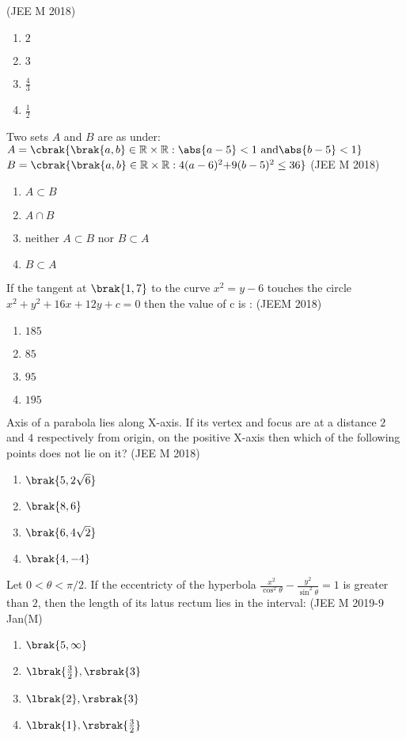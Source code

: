      \hfill{(JEE M 2018)}
	  \begin{enumerate}
    		\item $2$
    		\item $3$
    		\item $\frac{4}{3}$
    		\item $\frac{1}{2}$
	  \end{enumerate}
\item  Two sets $A$ and $B$ are as under:
$A=\cbrak{\brak{a,b}\in\mathbb{R}\times\mathbb{R}:\abs{a-5}<1\text{ and} \abs{b-5}<1}$
$B=\cbrak{\brak{a,b}\in\mathbb{R}\times\mathbb{R}:4(a-6)^2\text{+}9(b-5)^2\leq36}$
    \hfill{(JEE M 2018)}
	  \begin{enumerate}
		\item $A\subset B$ 
		\item $A\cap B$
		\item neither $A\subset B$ nor $B\subset A$
		\item $B\subset A$
	  \end{enumerate}
\item If the tangent at $\brak{1,7}$ to the curve $x^2=y-6$ touches the circle $x^2+y^2+16x+12y+c=0$ then the value of c is :
       \hfill{(JEEM 2018)}
	  \begin{enumerate}
    		\item $185$
    		\item $85$
    		\item $95$
    		\item $195$
	  \end{enumerate} 
\item Axis of a parabola lies along X-axis. If its vertex and focus are at a distance $2$ and $4$ respectively from origin, on the positive X-axis then which of the following points does not lie on it? 
     \hfill{(JEE M 2018)} 
	  \begin{enumerate}
    		\item $\brak{5,2\sqrt6}$
    		\item $\brak{8,6}$
    		\item $\brak{6,4\sqrt2}$
    		\item $\brak{4,-4}$
	  \end{enumerate}
\item Let $0<\theta<\pi/2$. If the eccentricty of the hyperbola $\frac{x^2}{\cos^2{\theta}} - \frac{y^2}{\sin^2{\theta}} = 1$ is greater than $2$, then the length of its latus rectum lies in the interval:
          \hfill{(JEE M 2019-9 Jan(M)}
	  \begin{enumerate}
    		\item $\brak{5,\infty}$
    		\item $\lbrak{\frac{3}{2}},\rsbrak{3}$
    		\item $\lbrak{2},\rsbrak{3}$ 
    		\item $\lbrak{1},\rsbrak{\frac{3}{2}}$
	  \end{enumerate} 
